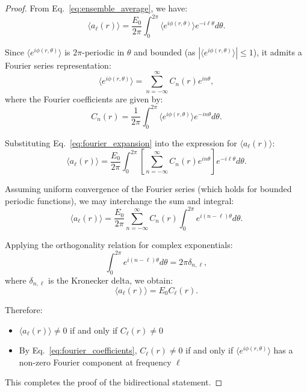 \documentclass[10pt,a4paper]{amsart}
\newcommand{\ev}[1]{\langle #1 \rangle}
\begin{document}
\begin{proof}
From Eq.~\ref{eq:ensemble_average}, we have:
\begin{equation}
    \ev{a_\ell(r)} = \frac{E_0}{2\pi} \int_0^{2\pi} \ev{e^{i\phi(r,\theta)}} e^{-i\ell\theta} d\theta.
\end{equation}

Since $\ev{e^{i\phi(r,\theta)}}$ is $2\pi$-periodic in $\theta$ and bounded (as $|\ev{e^{i\phi(r,\theta)}}| \leq 1$), it admits a Fourier series representation:
\begin{equation}
    \ev{e^{i\phi(r,\theta)}} = \sum_{n=-\infty}^{\infty} C_n(r) e^{in\theta},
    \label{eq:fourier_expansion}
\end{equation}
where the Fourier coefficients are given by:
\begin{equation}
    C_n(r) = \frac{1}{2\pi} \int_0^{2\pi} \ev{e^{i\phi(r,\theta)}} e^{-in\theta} d\theta.
    \label{eq:fourier_coefficients}
\end{equation}

Substituting Eq.~\ref{eq:fourier_expansion} into the expression for $\ev{a_\ell(r)}$:
\begin{equation}
    \ev{a_\ell(r)} = \frac{E_0}{2\pi} \int_0^{2\pi} \left[\sum_{n=-\infty}^{\infty} C_n(r) e^{in\theta}\right] e^{-i\ell\theta} d\theta.
\end{equation}

Assuming uniform convergence of the Fourier series (which holds for bounded periodic functions), we may interchange the sum and integral:
\begin{equation}
    \ev{a_\ell(r)} = \frac{E_0}{2\pi} \sum_{n=-\infty}^{\infty} C_n(r) \int_0^{2\pi} e^{i(n-\ell)\theta} d\theta.
\end{equation}

Applying the orthogonality relation for complex exponentials:
\begin{equation}
    \int_0^{2\pi} e^{i(n-\ell)\theta} d\theta = 2\pi \delta_{n,\ell},
\end{equation}
where $\delta_{n,\ell}$ is the Kronecker delta, we obtain:
\begin{equation}
    \ev{a_\ell(r)} = E_0 C_\ell(r).
    \label{eq:final_result}
\end{equation}

Therefore:
\begin{itemize}
    \item $\ev{a_\ell(r)} \neq 0$ if and only if $C_\ell(r) \neq 0$
    \item By Eq.~\ref{eq:fourier_coefficients}, $C_\ell(r) \neq 0$ if and only if $\ev{e^{i\phi(r,\theta)}}$ has a non-zero Fourier component at frequency $\ell$
\end{itemize}

This completes the proof of the bidirectional statement.
\end{proof}
\end{document}
